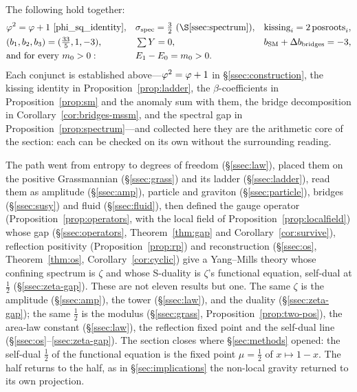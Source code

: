 \begin{theorem}\label{thm:core}
The following hold together:
\begin{equation}\label{eq:core}
\begin{aligned}
  &\golden^2=\golden+1\ \eqref{phi_sq_identity}, &&\sigma_{\mathrm{spec}}=\tfrac32\ (\S\ref{ssec:spectrum}), &&\text{kissing}_i=2\,\text{posroots}_i,\\
  &(b_1,b_2,b_3)=(\tfrac{33}5,1,-3), &&\textstyle\sum Y=0, &&b_{\mathrm{SM}}+\Delta b_{\mathrm{bridges}}=-3,\\
  &\text{and for every } m_0>0: &&E_1-E_0=m_0>0 . &&{}
\end{aligned}
\end{equation}
Each conjunct is established above---$\varphi^2=\varphi+1$ in \S\ref{ssec:construction}, the kissing
identity in Proposition~\ref{prop:ladder}, the $\beta$-coefficients in Proposition~\ref{prop:sm} and
the anomaly sum with them, the bridge decomposition in Corollary~\ref{cor:bridges-mssm}, and the
spectral gap in Proposition~\ref{prop:spectrum}---and collected here they are the arithmetic core of
the section: each can be checked on its own without the surrounding reading.


\end{theorem}

The path went from entropy to degrees of freedom (\S\ref{ssec:law}), placed them on the positive
Grassmannian (\S\ref{ssec:grass}) and its ladder (\S\ref{ssec:ladder}), read them as amplitude
(\S\ref{ssec:amp}), particle and graviton (\S\ref{ssec:particle}), bridges (\S\ref{ssec:susy}) and
fluid (\S\ref{ssec:fluid}), then defined the gauge operator (Proposition~\ref{prop:operators}, with the local field of
Proposition~\ref{prop:localfield}) whose gap (\S\ref{ssec:operators}, Theorem~\ref{thm:gap} and
Corollary~\ref{cor:survive}),
reflection positivity (Proposition~\ref{prop:rp}) and reconstruction (\S\ref{ssec:os},
Theorem~\ref{thm:os}, Corollary~\ref{cor:cyclic}) give a Yang--Mills theory whose
confining spectrum is $\zeta$ and whose S-duality is $\zeta$'s functional equation, self-dual at
$\tfrac12$ (\S\ref{ssec:zeta-gap}). These are not eleven results but one. The same $\zeta$ is the
amplitude (\S\ref{ssec:amp}), the tower (\S\ref{ssec:law}), and the duality
(\S\ref{ssec:zeta-gap}); the same $\tfrac12$ is the modulus (\S\ref{ssec:grass}, Proposition~\ref{prop:two-pos}), the area-law
constant (\S\ref{ssec:law}), the reflection fixed point and the self-dual line
(\S\ref{ssec:os}--\ref{ssec:zeta-gap}). The section closes where \S\ref*{sec:methods} opened: the
self-dual $\tfrac12$ of the functional equation is the fixed point $\mu=\tfrac12$ of
$x\mapsto1-x$. The half returns to the half, as in \S\ref*{sec:implications} the non-local gravity
returned to its own projection.

